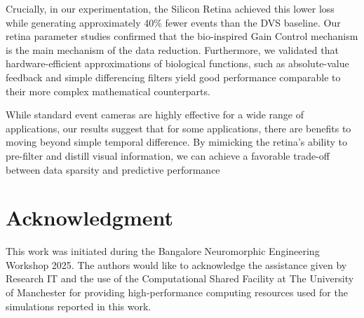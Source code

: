 \documentclass{article}
\begin{document}
Crucially, in our experimentation, the Silicon Retina achieved this lower loss while generating approximately 40\% fewer events than the DVS baseline. Our retina parameter studies confirmed that the bio-inspired Gain Control mechanism is the main mechanism of the data reduction. Furthermore, we validated that hardware-efficient approximations of biological functions, such as absolute-value feedback and simple differencing filters yield good performance comparable to their more complex mathematical counterparts. 

While standard event cameras are highly effective for a wide range of applications, our results suggest that for some applications, there are benefits to moving beyond simple temporal difference. By mimicking the retina's ability to pre-filter and distill visual information, we can achieve a favorable trade-off between data sparsity and predictive performance 

\section{Acknowledgment}
This work was initiated during the Bangalore Neuromorphic Engineering Workshop 2025. The authors would like to acknowledge the assistance given by Research IT and the use of the Computational Shared Facility at The University of Manchester for providing high-performance computing resources used for the simulations reported in this work.

\printbibliography
\end{document}
